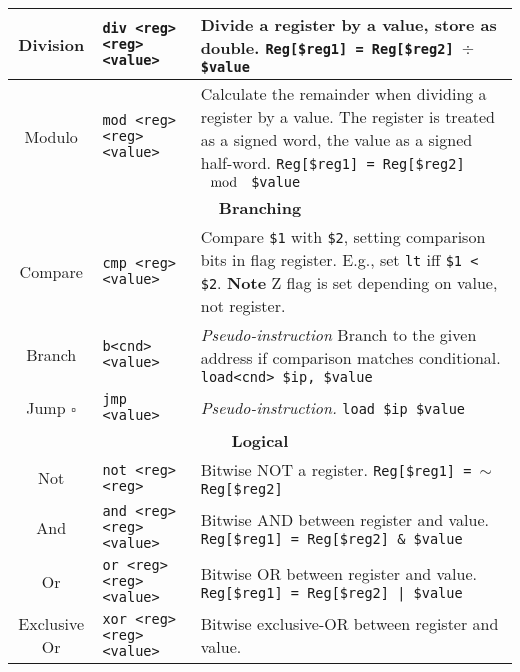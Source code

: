 \documentclass{article}
\begin{document}
\begin{longtable}{|c|l|l|}
    \hline
    Division & \texttt{div <reg> <reg> <value>} & \makecell[l]{Divide a register by a value, store as double.\\%
    \texttt{Reg[\$reg1] = Reg[\$reg2] \(\div\) \$value}} \\
    \hline
    Modulo & \texttt{mod <reg> <reg> <value>} & \makecell[l]{Calculate the remainder when dividing a register by a value.\\%
    The register is treated as a signed word,\\%
    the value as a signed half-word.\\%
    \texttt{Reg[\$reg1] = Reg[\$reg2] \(\mod\) \$value}} \\
    \hline \hline
    \multicolumn{3}{|c|}{\textbf{Branching}} \\
    \hline
    Compare & \texttt{cmp <reg> <value>} & \makecell[l]{Compare \texttt{\$1} with \texttt{\$2}, setting comparison bits in flag register.\\%
    E.g., set \texttt{lt} iff \texttt{\$1 < \$2}.\\%
    \textbf{Note} Z flag is set depending on value, not register.} \\
    \hline
    Branch & \texttt{b<cnd> <value>} & \makecell[l]{\textit{Pseudo-instruction}\\%
    Branch to the given address if comparison matches conditional.\\%
    \texttt{load<cnd> \$ip, \$value}} \\
    \hline
    Jump \(\square\) & \texttt{jmp <value>} & \makecell[l]{\textit{Pseudo-instruction.}\\%
    \texttt{load \$ip \$value}} \\
    \hline \hline
    \multicolumn{3}{|c|}{\textbf{Logical}} \\
    \hline
    Not & \texttt{not <reg> <reg>} & \makecell[l]{Bitwise NOT a register.\\%
    \texttt{Reg[\$reg1] = \(\sim\) Reg[\$reg2]}} \\
    \hline
    And & \texttt{and <reg> <reg> <value>} & \makecell[l]{Bitwise AND between register and value.\\%
    \texttt{Reg[\$reg1] = Reg[\$reg2] \& \$value}} \\
    \hline
    Or & \texttt{or <reg> <reg> <value>} & \makecell[l]{Bitwise OR between register and value.\\%
    \texttt{Reg[\$reg1] = Reg[\$reg2] | \$value}} \\
    \hline
    Exclusive Or & \texttt{xor <reg> <reg> <value>} & \makecell[l]{Bitwise exclusive-OR between register and value.\\%
}
\end{longtable}
\end{document}
